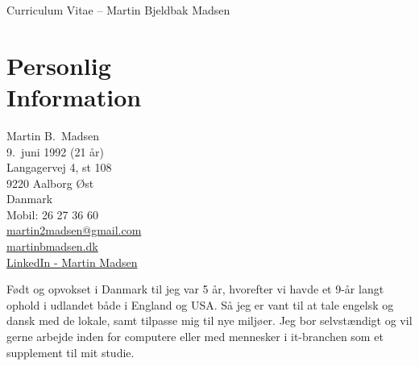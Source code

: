 \documentclass[margin,line,a4paper]{resume}
\begin{document}
\raggedright
{\sc \Large Curriculum Vitae -- Martin Bjeldbak Madsen}
\begin{resume}
    \vspace{0.5cm}
    \begin{figure}
         \vspace{-1cm}
        \begin{center}
        \end{center}
         \vspace{-2cm}
    \end{figure}

    \section{\mysidestyle Personlig\\Information}%
    Martin B.\ Madsen\\
    9.\ juni 1992 (21 år)\\ 
    Langagervej 4, st 108\\
    9220 Aalborg Øst\\
    Danmark\\
    Mobil: 26 27 36 60\\
    \href{mailto:martin2madsen@gmail.com}{martin2madsen@gmail.com}\\
    \href{http://www.martinbmadsen.dk}{martinbmadsen.dk}\\
    \href{http://dk.linkedin.com/pub/martin-madsen/21/9b0/b0}{LinkedIn - Martin Madsen}\vspace{1cm}

    Født og opvokset i Danmark til jeg var 5 år, hvorefter vi havde et
    9-år langt ophold i udlandet både i England og USA. Så jeg er vant
    til at tale engelsk og dansk med de lokale, samt tilpasse mig til
    nye miljøer. Jeg bor selvstændigt og vil gerne arbejde inden for
    computere eller med mennesker i it-branchen som et supplement til
    mit studie.


\end{resume}
\end{document}
